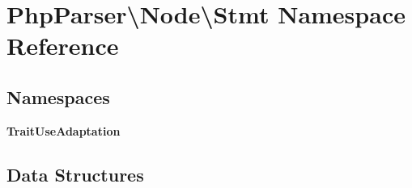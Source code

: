 \section{Php\+Parser\textbackslash{}Node\textbackslash{}Stmt Namespace Reference}
\label{namespace_php_parser_1_1_node_1_1_stmt}
\subsection*{Namespaces}
\begin{DoxyCompactItemize}
\item 
 {\bf Trait\+Use\+Adaptation}
\end{DoxyCompactItemize}
\subsection*{Data Structures}
